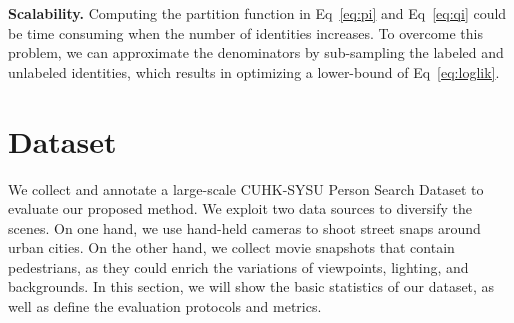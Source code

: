 \textbf{Scalability.} Computing the partition function in Eq~\eqref{eq:pi} and Eq~\eqref{eq:qi} could be time consuming when the number of identities increases. To overcome this problem, we can approximate the denominators by sub-sampling the labeled and unlabeled identities, which results in optimizing a lower-bound of Eq~\eqref{eq:loglik}.


\section{Dataset} %
\label{sec:dataset}
We collect and annotate a large-scale CUHK-SYSU Person Search Dataset to evaluate our proposed method. We exploit two data sources to diversify the scenes. On one hand, we use hand-held cameras to shoot street snaps around urban cities. On the other hand, we collect movie snapshots that contain pedestrians, as they could enrich the variations of viewpoints, lighting, and backgrounds. In this section, we will show the basic statistics of our dataset, as well as define the evaluation protocols and metrics.

